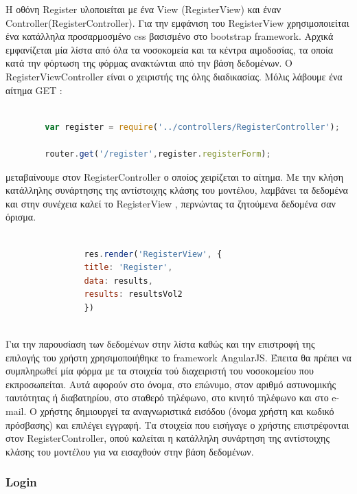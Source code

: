 		Η οθόνη Register υλοποιείται με ένα View (RegisterView) και έναν Controller(RegisterController). Για την εμφάνιση του  RegisterView χρησιμοποιείται ένα κατάλληλα προσαρμοσμένο css βασισμένο στο bootstrap framework. Αρχικά εμφανίζεται μία λίστα από όλα τα νοσοκομεία και τα κέντρα αιμοδοσίας, τα οποία κατά την φόρτωση της φόρμας ανακτώνται από την βάση δεδομένων. O RegisterViewController είναι ο χειριστής της όλης διαδικασίας. Μόλις λάβουμε ένα αίτημα GET :
		
		\begin{lstlisting}[language=Javascript]			
		
		var register = require('../controllers/RegisterController');
		
		router.get('/register',register.registerForm);  


		\end{lstlisting}
		

μεταβαίνουμε στον RegisterController ο οποίος χειρίζεται το αίτημα. Με την κλήση κατάλληλης συνάρτησης της αντίστοιχης κλάσης του μοντέλου, λαμβάνει τα δεδομένα και στην συνέχεια καλεί το RegisterView , περνώντας τα ζητούμενα δεδομένα σαν όρισμα.



		\begin{lstlisting}[language=Javascript]			
		
	            res.render('RegisterView', { 
                title: 'Register',
                data: results,
                results: resultsVol2
				})
				
		\end{lstlisting}


	Για την παρουσίαση των δεδομένων στην λίστα καθώς και την επιστροφή της επιλογής του χρήστη χρησιμοποιήθηκε το framework AngularJS. Έπειτα θα πρέπει να συμπληρωθεί μία φόρμα με τα στοιχεία τού διαχειριστή του νοσοκομείου που εκπροσωπείται. Αυτά αφορούν στο όνομα, στο επώνυμο, στον αριθμό αστυνομικής ταυτότητας ή διαβατηρίου, στο σταθερό τηλέφωνο, στο κινητό τηλέφωνο και στο e-mail. Ο χρήστης δημιουργεί τα αναγνωριστικά εισόδου (όνομα χρήστη και κωδικό πρόσβασης) και επιλέγει εγγραφή.  Τα στοιχεία που εισήγαγε ο χρήστης επιστρέφονται στον RegisterController, οπού καλείται η κατάλληλη συνάρτηση της αντίστοιχης κλάσης του μοντέλου για να εισαχθούν στην βάση δεδομένων.
	
	
		\subsubsection{Login}
		
